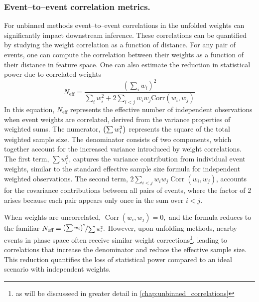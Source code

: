         \subsubsection{Event--to--event correlation metrics.}
            For unbinned methods event--to--event correlations in the unfolded weights can significantly impact downstream inference.
            These correlations can be quantified by studying the weight correlation as a function of distance.
            For any pair of events, one can compute the correlation between their weights as a function of their distance in feature space.
            One can also estimate the reduction in statistical power due to correlated weights
            \begin{equation}
                \label{eq:n-eff}
                N_{\text{eff}} = \frac{\left(\sum_{i} w_i\right)^2}{\sum_{i} w_i^2 + 2\sum_{i<j} w_i w_j \text{Corr}(w_i, w_j)}
            \end{equation}
            In this equation, \(N_{\text{eff}}\) represents the effective number of independent observations when event weights are correlated, derived from the variance properties of weighted sums.
            The numerator, \(\qty(\sum w_i^2)\) represents the square of the total weighted sample size.
            The denominator consists of two components, which together account for the increased variance introduced by weight correlations.
            The first term, \(\sum w_i^2\), captures the variance contribution from individual event weights, similar to the standard effective sample size formula for independent weighted observations.
            The second term, \(2\sum_{i<j} w_i w_j \operatorname{Corr}(w_i, w_j)\), accounts for the covariance contributions between all pairs of events, where the factor of 2 arises because each pair appears only once in the sum over \(i<j\).

            When weights are uncorrelated, \(\operatorname{Corr}(w_i, w_j) = 0,\) and the formula reduces to the familiar \(N_{\text{eff}}=\nicefrac{\qty(\sum w_i)^2}{\sum w_i^2}.\)
            However, upon unfolding methods, nearby events in phase space often receive similar weight corrections\footnote{as will be discusseed in greater detail in \cref{chap:unbinned_correlations}}, leading to correlations that increase the denominator and reduce the effective sample size.
            This reduction quantifies the loss of statistical power compared to an ideal scenario with independent weights.

